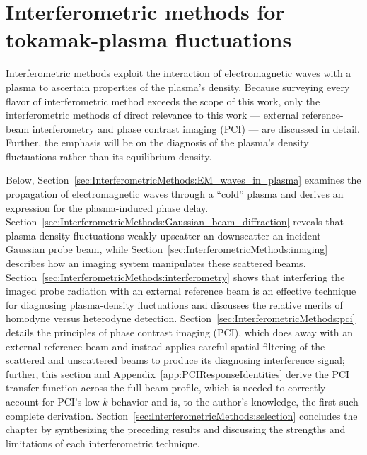 \chapter{Interferometric methods for tokamak-plasma fluctuations}
\label{ch:InterferometricMethods}
Interferometric methods exploit the interaction of
electromagnetic waves with a plasma
to ascertain properties of the plasma's density.
Because surveying every flavor of interferometric method
exceeds the scope of this work,
only the interferometric methods
of direct relevance to this work ---
external reference-beam interferometry and phase contrast imaging (PCI) ---
are discussed in detail.
Further, the emphasis will be on the diagnosis of
the plasma's density fluctuations rather than its equilibrium density.

Below, Section~\ref{sec:InterferometricMethods:EM_waves_in_plasma}
examines the propagation of electromagnetic waves through a ``cold'' plasma
and derives an expression for the plasma-induced phase delay.
Section~\ref{sec:InterferometricMethods:Gaussian_beam_diffraction} reveals that
plasma-density fluctuations weakly upscatter an downscatter
an incident Gaussian probe beam, while
Section~\ref{sec:InterferometricMethods:imaging} describes
how an imaging system manipulates these scattered beams.
Section~\ref{sec:InterferometricMethods:interferometry} shows that
interfering the imaged probe radiation with an external reference beam
is an effective technique for diagnosing plasma-density fluctuations and
discusses the relative merits of homodyne versus heterodyne detection.
Section~\ref{sec:InterferometricMethods:pci} details the principles of
phase contrast imaging (PCI),
which does away with an external reference beam and
instead applies careful spatial filtering
of the scattered and unscattered beams
to produce its diagnosing interference signal;
further, this section and Appendix~\ref{app:PCIResponseIdentities}
derive the PCI transfer function across the full beam profile, which
is needed to correctly account for PCI's low-$k$ behavior and is,
to the author's knowledge, the first such complete derivation.
Section~\ref{sec:InterferometricMethods:selection}
concludes the chapter by synthesizing the preceding results and
discussing the strengths and limitations of each interferometric technique.


